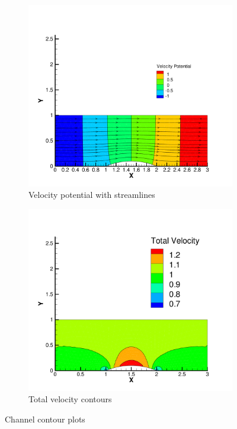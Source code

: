 \documentclass[a4paper]{article}
\begin{document}
\begin{figure}[h]
  \centering
  \begin{subfigure}{0.45\textwidth}
    \includegraphics[width=\textwidth]{figures/potential_contour}
    \caption{Velocity potential with streamlines}
    \label{fig:potential}
  \end{subfigure}
  \begin{subfigure}{0.45\textwidth}
    \includegraphics[width=\textwidth]{figures/Vt_contour}
    \caption{Total velocity contours}
    \label{fig:Vt-contour}
  \end{subfigure}
  \caption{Channel contour plots}
\end{figure}
\end{document}
